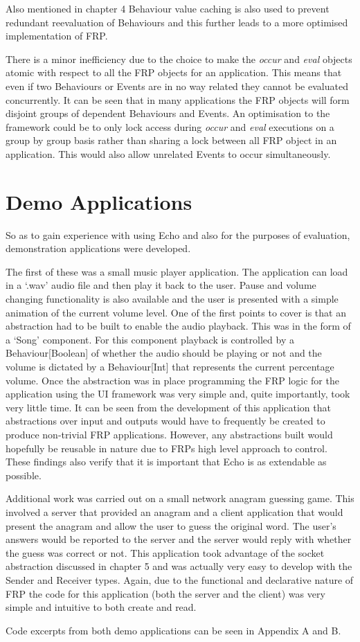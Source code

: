     Also mentioned in chapter 4 Behaviour value caching is also used to prevent redundant reevaluation of Behaviours
    and this further leads to a more optimised implementation of FRP.
    
    There is a minor inefficiency due to the choice to make the \emph{occur} and \emph{eval} objects atomic
    with respect to all the FRP objects for an application. This means that even if two Behaviours or Events are in no way
    related they cannot be evaluated concurrently. It can be seen that in many applications the FRP objects will
    form disjoint groups of dependent Behaviours and Events. An optimisation to the framework could be to
    only lock access during \emph{occur} and \emph{eval} executions on a group by group basis rather than sharing
    a lock between all FRP object in an application. This would also allow unrelated Events to occur simultaneously.
  
  \section{Demo Applications}
    So as to gain experience with using Echo and also for the purposes of evaluation, demonstration
    applications were developed. 
    
    The first of these was a small music player application. The application
    can load in a `.wav' audio file and then play it back to the user. Pause and volume changing functionality
    is also available and the user is presented with a simple animation of the current volume level. One of the
    first points to cover is that an abstraction had to be built to enable the audio playback. This was in the form
    of a `Song' component. For this component playback is controlled by a Behaviour[Boolean] of whether the audio
    should be playing or not and the volume is dictated by a Behaviour[Int] that represents the current percentage
    volume. Once the abstraction was in place programming the FRP logic for the application using the 
    UI framework was very simple and, quite importantly, took very little time. It can be seen from
    the development of this application that abstractions over input and outputs would have to frequently be
    created to produce non-trivial FRP applications. However, any abstractions built would hopefully be
    reusable in nature due to FRPs high level approach to control. These findings also verify that it
    is important that Echo is as extendable as possible.
    
    Additional work was carried out on a small network anagram guessing game. This involved a server that provided
    an anagram and a client application that would present the anagram and allow the user to guess the original
    word. The user's answers would be reported to the server and the server would reply with whether
    the guess was correct or not. This application took advantage of the socket abstraction discussed in chapter 5
    and was actually very easy to develop with the Sender and Receiver types. Again, due to the functional and
    declarative nature of FRP the code for this application (both the server and the client) was very simple
    and intuitive to both create and read.
    
    Code excerpts from both demo applications can be seen in Appendix A and B. 